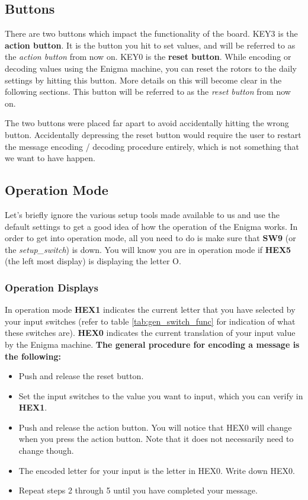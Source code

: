 \documentclass{article}
\begin{document}
\subsection{Buttons}
There are two buttons which impact the functionality of the board. KEY3 is the \textbf{action button}. It is the button you hit to set values, and will be referred to as the \textit{action button} from now on. KEY0 is the \textbf{reset button}. While encoding or decoding values using the Enigma machine, you can reset the rotors to the daily settings by hitting this button. More details on this will become clear in the following sections. This button will be referred to as the \textit{reset button} from now on. 

The two buttons were placed far apart to avoid accidentally hitting the wrong button. Accidentally depressing the reset button would require the user to restart the message encoding / decoding procedure entirely, which is not something that we want to have happen. 

\subsection{Operation Mode} \label{oppmode}
Let's briefly ignore the various setup tools made available to us and use the default settings to get a good idea of how the operation of the Enigma works. In order to get into operation mode, all you need to do is make sure that \textbf{SW9} (or the \textit{setup\_switch}) is down. You will know you are in operation mode if \textbf{HEX5} (the left most display) is displaying the letter O. 

\subsubsection{Operation Displays}
In operation mode \textbf{HEX1} indicates the current letter that you have selected by your input switches (refer to table \ref{tab:gen_switch_func} for indication of what these switches are). \textbf{HEX0} indicates the current translation of your input value by the Enigma machine. \textbf{The general procedure for encoding a message is the following: }
\begin{itemize}
    \item Push and release the reset button.
    \item Set the input switches to the value you want to input, which you can verify in \textbf{HEX1}.
    \item Push and release the action button. You will notice that HEX0 will change when you press the action button. Note that it does not necessarily need to change though. 
    \item The encoded letter for your input is the letter in HEX0. Write down HEX0. 
    \item Repeat steps 2 through 5 until you have completed your message. 
\end{itemize}
\end{document}
